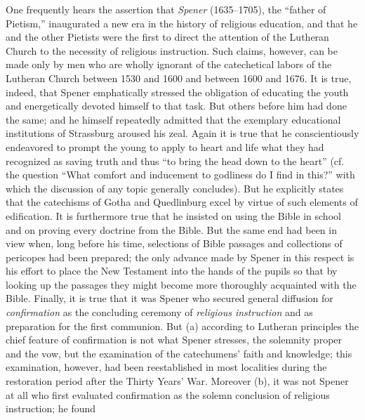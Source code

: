 One frequently hears the assertion that \emph{Spener} (1635–1705), the “father of Pietism,” inaugurated a new era in the history of religious education, and that he and the other Pietists were the first to direct the attention of the Lutheran Church to the necessity of religious instruction. Such claims,
however, can be made only by men who are wholly ignorant of the catechetical labors of the Lutheran Church between 1530 and 1600 and between 1600 and 1676. It is true, indeed, that Spener emphatically stressed the obligation of educating the youth and energetically devoted himself to that task. But others before him had done the same; and he himself repeatedly admitted that the exemplary educational institutions of Strassburg aroused his zeal. Again it is true that he conscientiously endeavored to prompt the young to apply to heart and life what they had recognized as saving truth and thus “to bring the head down to the heart” (cf. the question “What comfort and inducement to godliness do I find in this?” with which the discussion of any topic generally concludes). But he explicitly states that the catechisms of Gotha and Quedlinburg excel by virtue of such elements of edification. It is furthermore true that he insisted on using the Bible in school and on proving every doctrine from the Bible. But the same end had been in view when, long before his time, selections of Bible passages and collections of pericopes had been prepared; the only advance made by Spener in this respect is his effort to place the New Testament into the hands of the pupils so that by looking up the passages they might become more thoroughly acquainted with the Bible. Finally, it is true that it was Spener who secured general diffusion for \emph{confirmation} as the concluding ceremony of \emph{religious instruction} and as preparation for the first communion. But (a) according to Lutheran principles the chief feature of confirmation is not what Spener stresses, the solemnity proper and the vow, but the examination of the catechumens’ faith and knowledge; this examination, however, had been reestablished in most localities during the restoration period after the Thirty Years’ War. Moreover (b), it was not Spener at all who first evaluated confirmation as the solemn conclusion of religious instruction; he found
